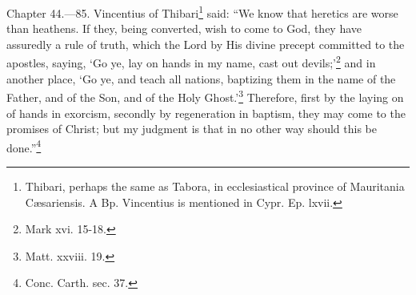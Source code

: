 
Chapter 44.—85. Vincentius of Thibari\footnote{\par  Thibari, perhaps the same as Tabora, in ecclesiastical province of Mauritania Cæsariensis. A Bp. Vincentius is mentioned in Cypr. Ep. lxvii.} said: ``We know that heretics are worse than heathens. If they, being converted, wish to come to God, they have assuredly a rule of truth, which the Lord by His divine precept committed to the apostles, saying, ‘Go ye, lay on hands in my name, cast out devils;’\footnote{\par  Mark xvi. 15-18.} and in another place, ‘Go ye, and teach all nations, baptizing them in the name of the Father, and of the Son, and of the Holy Ghost.’\footnote{\par  Matt. xxviii. 19.} Therefore, first by the laying on of hands in exorcism, secondly by regeneration in baptism, they may come to the promises of Christ; but my judgment is that in no other way should this be done.''\footnote{\par  Conc. Carth. sec. 37.}

